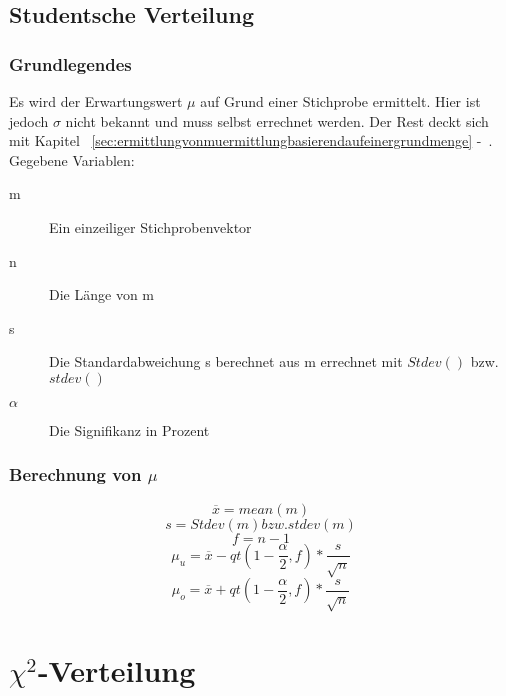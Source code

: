 \documentclass[a4paper,10pt]{article}
\begin{document}
\subsection{Studentsche Verteilung}
\subsubsection{Grundlegendes}
Es wird der Erwartungswert $ \mu $ auf Grund einer Stichprobe ermittelt. Hier
ist jedoch $ \sigma $ nicht bekannt und muss selbst errechnet werden. Der Rest
deckt sich mit Kapitel
~\autoref{sec:ermittlungvonmuermittlungbasierendaufeinergrundmenge}
-~.
\\
Gegebene Variablen:
\begin{description}
\item[m] Ein einzeiliger Stichprobenvektor
\item[n] Die Länge von m
\item[s] Die Standardabweichung s berechnet aus m errechnet mit $
  Stdev() $ bzw. $ stdev() $
\item[$ \alpha $] Die Signifikanz in Prozent
\end{description}

\subsubsection{Berechnung von $ \mu $}
\begin{equation}
  \overline{x} = mean(m)
\end{equation}
\begin{equation}
  s = Stdev(m) bzw. stdev(m)
\end{equation}
\begin{equation}
  f = n -1
\end{equation}
\begin{equation}
  \mu_u = \overline{x} - qt(1 - \frac{\alpha}{2}, f) * \frac{s}{\sqrt{n}}
\end{equation}
\begin{equation}
  \mu_o = \overline{x} + qt(1 - \frac{\alpha}{2}, f) * \frac{s}{\sqrt{n}}
\end{equation}

\section{$ \chi ^2 $-Verteilung}
\end{document}
